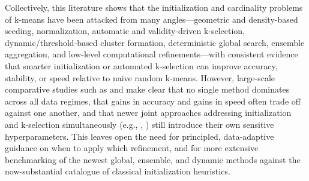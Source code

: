 Collectively, this literature shows that the initialization and cardinality problems of k-means have been attacked from many angles---geometric and density-based seeding, normalization, automatic and validity-driven k-selection, dynamic/threshold-based cluster formation, deterministic global search, ensemble aggregation, and low-level computational refinements---with consistent evidence that smarter initialization or automated k-selection can improve accuracy, stability, or speed relative to naive random k-means. However, large-scale comparative studies such as \cite{harris2022extensive} and \cite{li2018experiment} make clear that no single method dominates across all data regimes, that gains in accuracy and gains in speed often trade off against one another, and that newer joint approaches addressing initialization and k-selection simultaneously (e.g., \cite{ran2021novel}, \cite{zhao2022design}) still introduce their own sensitive hyperparameters. This leaves open the need for principled, data-adaptive guidance on when to apply which refinement, and for more extensive benchmarking of the newest global, ensemble, and dynamic methods against the now-substantial catalogue of classical initialization heuristics.


